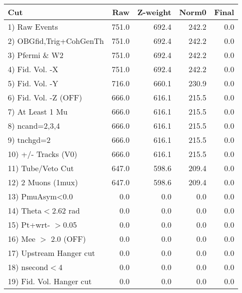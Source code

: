  \begin{table}[h!]\centering
 \begin{tabular}{||l||r|r|r|r||}
 \hline
 \hline
 Cut & Raw & Z-weight & Norm0 & Final \\
 \hline
  1) Raw Events           &       751.0 &       692.4 &       242.2 &         0.0 \\
  2) OBGfid,Trig+CohGenTh &       751.0 &       692.4 &       242.2 &         0.0 \\
  3) Pfermi \& W2         &       751.0 &       692.4 &       242.2 &         0.0 \\
  4) Fid. Vol. -X         &       751.0 &       692.4 &       242.2 &         0.0 \\
  5) Fid. Vol. -Y         &       716.0 &       660.1 &       230.9 &         0.0 \\
  6) Fid. Vol. -Z (OFF)   &       666.0 &       616.1 &       215.5 &         0.0 \\
  7) At Least 1 Mu        &       666.0 &       616.1 &       215.5 &         0.0 \\
  8) ncand=2,3,4          &       666.0 &       616.1 &       215.5 &         0.0 \\
  9) tnchgd=2             &       666.0 &       616.1 &       215.5 &         0.0 \\
 10) +/- Tracks (V0)      &       666.0 &       616.1 &       215.5 &         0.0 \\
 11) Tube/Veto Cut        &       647.0 &       598.6 &       209.4 &         0.0 \\
 12) 2 Muons (1mux)       &       647.0 &       598.6 &       209.4 &         0.0 \\
 13) PmuAsym<0.0          &         0.0 &         0.0 &         0.0 &         0.0 \\
 14) Theta$<$2.62 rad     &         0.0 &         0.0 &         0.0 &         0.0 \\
 15) Pt+wrt- $>$0.05      &         0.0 &         0.0 &         0.0 &         0.0 \\
 16) Mee $>$ 2.0  (OFF)   &         0.0 &         0.0 &         0.0 &         0.0 \\
 17) Upstream Hanger cut  &         0.0 &         0.0 &         0.0 &         0.0 \\
 18) nsecond$<$4          &         0.0 &         0.0 &         0.0 &         0.0 \\
 19) Fid. Vol. Hanger cut &         0.0 &         0.0 &         0.0 &         0.0 \\

\end{tabular}
\end{table}
